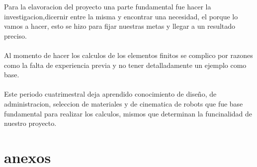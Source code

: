 \documentclass[12pt,letterpaper]{article}
\begin{document}
Para la elavoracion del proyecto una parte fundamental fue hacer la investigacion,dicernir entre la misma y encontrar una necesidad, el porque lo vamos a hacer, esto se hizo para fijar nuestras metas y llegar a un resultado preciso.
\\\\
Al momento de hacer los calculos de los elementos finitos se complico por razones como la falta de experiencia previa y no tener detalladamente un ejemplo como base.
\\\\
Este periodo cuatrimestral deja aprendido conocimiento de diseño, de administracion, seleccion de materiales y de cinematica de robots que fue base fundamental para realizar los calculos, mismos que determinan la funcinalidad de nuestro proyecto.

\newpage


\section*{anexos}
\\


\end{document}
